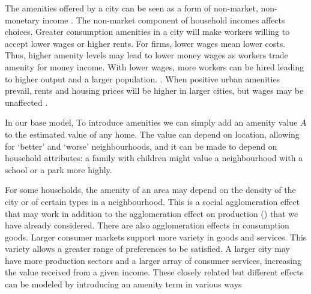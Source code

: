 The amenities offered by a city can be seen as a form of non-market, non-monetary income \cite{kaufmannScalingUrbanAmenities2022}.  The non-market component of household incomes affects choices. Greater consumption amenities in a city will make workers willing to accept lower wages or higher rents. For firms,  lower wages mean lower costs. Thus,  higher amenity levels may lead to lower money wages as workers trade amenity for money income. With lower wages, more workers can be hired leading to higher output and a larger population. \cite{pugaMagnitudeCausesAgglomeration2010}. 
When positive urban amenities prevail, rents and housing prices will be higher in larger cities, but wages may be unaffected \cite{robackWagesRentsAmenities1988, dalmazzoAmenitiesSkillbiasedAgglomeration2011}.






In our base model,  To introduce amenities we can simply add an amenity value $A$ to the estimated value of any home. The value can depend on location, allowing for `better' and `worse' neighbourhoods,  and it can be made to depend on household attributes: a family with children might value a neighbourhood with a school or a park more highly. 

For some households, the amenity of an area may depend on the density of the city or of certain types in a neighbourhood. This is a social agglomeration effect that may work in addition to the agglomeration effect on production (\cite{gurwitzCatastrophicAgglomeration2019}) that we have already considered. There are also agglomeration effects in consumption goods. Larger consumer markets support more variety in goods and services. This variety allows a greater range of preferences to be satisfied. A larger city may have more production sectors and a larger array of consumer services, increasing the value received from a given income.  These closely related but different effects can be modeled by introducing an amenity term in various ways 

